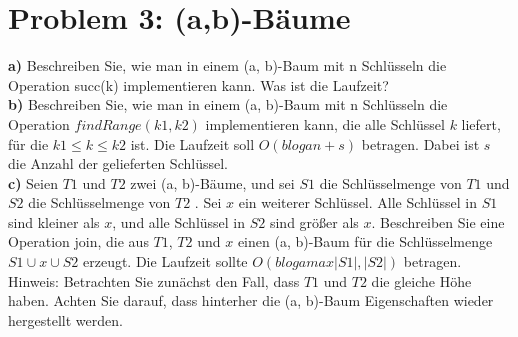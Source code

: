 \section*{Problem 3: (a,b)-Bäume} 

\textbf{a)} Beschreiben Sie, wie man in einem (a, b)-Baum mit n Schlüsseln die Operation succ(k) implementieren kann. Was ist die Laufzeit?\\

\noindent
\textbf{b)} Beschreiben Sie, wie man in einem (a, b)-Baum mit n Schlüsseln die Operation $findRange(k1 , k2)$ implementieren kann, die alle Schlüssel $k$ liefert, für die
$k1 \leq k \leq k2$ ist. Die Laufzeit soll $O(b loga n + s)$ betragen. Dabei ist $s$ die Anzahl der gelieferten Schlüssel.\\

\noindent
\textbf{c)} Seien $T1$ und $T2$ zwei (a, b)-Bäume, und sei $S1$ die Schlüsselmenge von $T1$ und $S2$ die Schlüsselmenge von $T2$ . Sei $x$ ein weiterer Schlüssel. Alle Schlüssel in $S1$ sind kleiner als $x$, und alle Schlüssel in $S2$ sind größer als $x$. Beschreiben Sie eine Operation join, die aus $T1$, $T2$ und $x$ einen (a, b)-Baum für die Schlüsselmenge $S1 \cup {x} \cup S2$ erzeugt. Die Laufzeit sollte $O(b loga max{|S1|, |S2|})$ betragen. Hinweis: Betrachten Sie zunächst den Fall, dass $T1$ und $T2$ die gleiche Höhe haben. Achten Sie darauf, dass hinterher die (a, b)-Baum Eigenschaften wieder hergestellt werden.